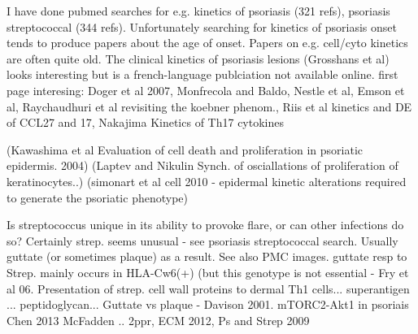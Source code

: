 \documentclass[a4paper,10pt]{report}
\begin{document}
I have done pubmed searches for e.g. kinetics of psoriasis (321 refs), psoriasis streptococcal (344 refs). Unfortunately searching for kinetics of psoriasis onset tends to produce papers about the age of onset. Papers on e.g. cell/cyto kinetics are often quite old. The clinical kinetics of psoriasis lesions (Grosshans et al) looks interesting but is a french-language publciation not available online. 
first page interesing: Doger et al 2007, Monfrecola and Baldo, Nestle et al, Emson et al, Raychaudhuri et al revisiting the koebner phenom., Riis et al kinetics and DE of CCL27 and 17, Nakajima Kinetics of Th17 cytokines


(Kawashima et al Evaluation of cell death and proliferation in psoriatic epidermis. 2004)
(Laptev and Nikulin Synch. of osciallations of proliferation of keratinocytes..)
(simonart et al cell 2010 - epidermal kinetic alterations required to generate the psoriatic phenotype)



Is streptococcus unique in its ability to provoke flare, or can other infections do so? Certainly strep. seems unusual - see psoriasis streptococcal search. Usually guttate (or sometimes plaque) as a result. See also PMC images. 
guttate resp to Strep. mainly occurs in HLA-Cw6(+) (but this genotype is not essential - Fry et al 06. Presentation of strep. cell wall proteins to dermal Th1 cells... superantigen ... peptidoglycan...
Guttate vs plaque - Davison 2001. 
mTORC2-Akt1 in psoriais Chen 2013
McFadden .. 2ppr, ECM 2012, Ps and Strep 2009 
\end{document}
